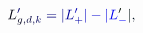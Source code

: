 \documentclass[12pt]{article}
\begin{document}
\makeatletter
\renewcommand*{\@textcolor}[3]{%
  \protect\leavevmode
  \begingroup
    \color#1{#2}#3%
  \endgroup
}
\makeatother
\begin{displaymath}
\mathcolor[RGB]{0,0,15}{L} _ { \mathcolor[RGB]{0,0,30}{g} \mathcolor[RGB]{0,0,45}{,} \mathcolor[RGB]{0,0,60}{d} \mathcolor[RGB]{0,0,75}{,} \mathcolor[RGB]{0,0,90}{k} } ^ { \mathcolor[RGB]{0,0,105}{\prime} } \mathcolor[RGB]{0,0,120}{=} \mathcolor[RGB]{0,0,135}{|} \mathcolor[RGB]{0,0,150}{L} _ { \mathcolor[RGB]{0,0,165}{+} } ^ { \mathcolor[RGB]{0,0,180}{\prime} } \mathcolor[RGB]{0,0,195}{|} \mathcolor[RGB]{0,0,210}{-} \mathcolor[RGB]{0,0,225}{|} \mathcolor[RGB]{0,0,240}{L} _ { \mathcolor[RGB]{0,0,255}{-} } ^ { \mathcolor[RGB]{0,15,0}{\prime} } \mathcolor[RGB]{0,15,15}{|} \mathcolor[RGB]{0,15,30}{,}
\end{displaymath}
\end{document}
